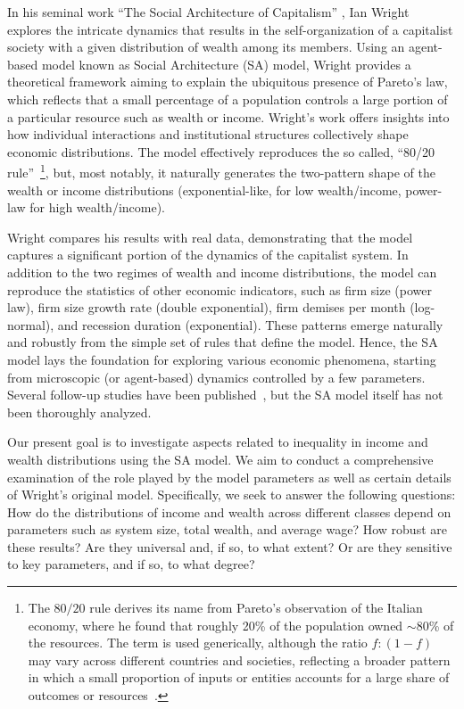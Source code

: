 In his seminal work ``The Social Architecture of Capitalism'' \cite{WRIGHT2005589},  Ian Wright explores the intricate dynamics that results in the self-organization of a capitalist society with a given distribution of wealth among its members. Using an agent-based model known as Social Architecture (SA) model, Wright provides a theoretical framework aiming to explain the ubiquitous presence of Pareto's law, which reflects that a small percentage of a population controls a large portion of a particular resource such as wealth or income. Wright's work offers insights into how individual interactions and institutional structures collectively shape economic distributions.  
%
The model effectively reproduces the so called, ``80/20 rule''~\footnote{
 The $80/20$ rule derives its name from Pareto's observation of the Italian economy, where he found that roughly 20\% of the population owned $\sim 80$\% of the resources. The term is used generically, although the ratio $f:(1-f)$ may vary across different countries and societies, reflecting a broader pattern in which a small proportion of inputs or entities accounts for a large share of outcomes or resources~\cite{boghosian2014,boghosian2014a}.}, but, most notably, it naturally generates the two-pattern shape of the wealth or income distributions (exponential-like, for low wealth/income, power-law for high wealth/income). 

Wright compares his results with real data, demonstrating that the model captures a significant portion of the dynamics of the capitalist system. 
In addition to the two regimes of wealth and income distributions, the model can reproduce the statistics of other economic indicators, such as
firm size (power law), firm size growth rate (double exponential), firm demises per month (log-normal), and recession duration (exponential). These patterns emerge naturally and robustly from the simple set of rules that define the model. 
%
Hence, the SA model lays the foundation for exploring various economic phenomena, starting from microscopic (or agent-based) dynamics controlled by a few parameters. Several follow-up studies have been published~\cite{Cottrell2009,WRIGHT2010,LAVICKA2010,ISAAC2019,VILLA2022,MAX2024}, but the SA model itself has not been thoroughly analyzed.
 

Our present goal is to investigate aspects related to inequality in income and wealth distributions using the SA model. We aim to conduct a comprehensive examination of the role played by the model parameters as well as certain details of Wright's original model. Specifically, we seek to answer the following questions: How do the distributions of income and wealth across different classes depend on parameters such as system size, total wealth, and average wage? How robust are these results? Are they universal and, if so, to what extent? Or are they sensitive to key parameters, and if so, to what degree?

